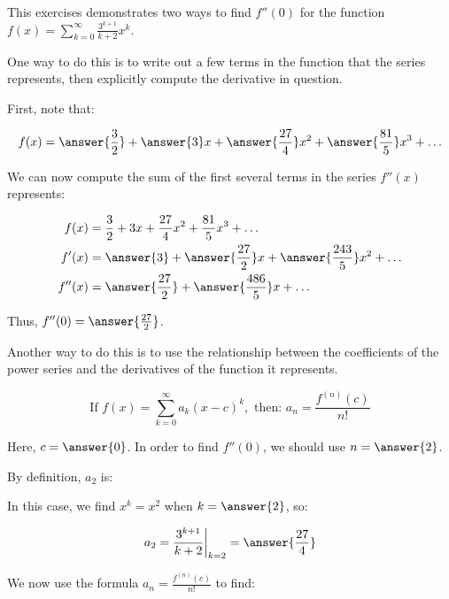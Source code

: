 \documentclass{ximera}
\author{Jim Talamo}
\begin{document}
\begin{exercise}
This exercises demonstrates two ways to find $f''(0)$ for the function $f(x) = \sum_{k=0}^{\infty} \frac{3^{k+1}}{k+2}x^k$.  

One way to do this is to write out a few terms in the function that the series represents, then explicitly compute the derivative in question.  

First, note that:

\[
f(x) = \answer{\frac{3}{2}}+\answer{3}x+\answer{\frac{27}{4}}x^2+\answer{\frac{81}{5}}x^3+\ldots
\]

\begin{exercise}
We can now compute the sum of the first several terms in the series $f''(x)$ represents:

\begin{align*}
f(x) &= \frac{3}{2}+3x+\frac{27}{4}x^2+\frac{81}{5}x^3+\ldots \\
f'(x) &= \answer{3}+\answer{\frac{27}{2}}x+\answer{\frac{243}{5}}x^2+\ldots \\
f''(x) &= \answer{\frac{27}{2}}+\answer{\frac{486}{5}}x+\ldots \\
\end{align*}

Thus, $f''(0) = \answer{\frac{27}{2}}$.
\end{exercise}

\begin{exercise}
Another way to do this is to use the relationship between the coefficients of the power series and the derivatives of the function it represents.

\[
\textrm{If } f(x) = \sum_{k=0}^{\infty} a_k(x-c)^k, \textrm{ then: } a_n = \frac{f^{(n)}(c)}{n!}
\]

Here, $c=\answer{0}$.  In order to find $f''(0)$, we should use $n=\answer{2}$.

By definition, $a_2$ is:

\begin{multipleChoice}
\end{multipleChoice}

In this case, we find $x^k = x^2$ when $k=\answer{2}$, so:

\[
a_2 =  \frac{3^{k+1}}{k+2} \bigg|_{k=2} = \answer{\frac{27}{4}}
\]

\begin{exercise}
We now use the formula $a_n = \frac{f^{(n)}(c)}{n!}$ to find:


\end{exercise}
\end{exercise}
\end{exercise}
\end{document}
